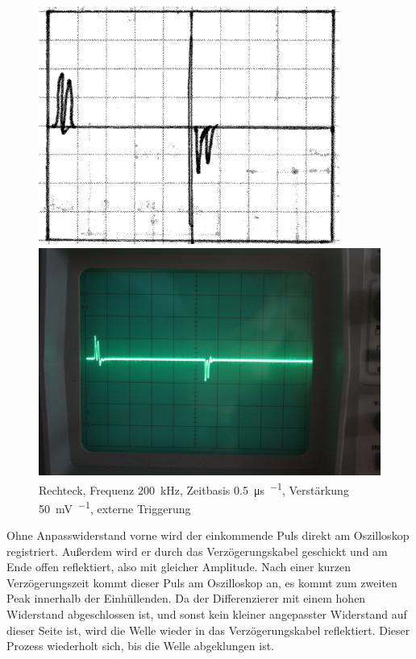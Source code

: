 \begin{figure}[htbp]
	\centering
	\begin{minipage}{.45\linewidth}
	\includegraphics[width=\linewidth]{Skizzen/IMG_0765-1500.jpg}
	\end{minipage}
	\hfill
	\begin{minipage}{.45\linewidth}
	\includegraphics[width=\linewidth]{Fotos/IMG_0765-1500.jpg}
	\end{minipage}
	\caption{%
		Rechteck, Frequenz \SI{200}{\kilo\hertz},
		Zeitbasis \SI{.5}{\micro\second\per\division},
		Verstärkung \SI{50}{\milli\volt\per\division},
		externe Triggerung
	}
	\label{fig:0765}
\end{figure}

Ohne Anpasswiderstand vorne wird der einkommende Puls direkt am Oszilloskop
registriert. Außerdem wird er durch das Verzögerungskabel geschickt und am Ende
offen reflektiert, also mit gleicher Amplitude. Nach einer kurzen
Verzögerungszeit kommt dieser Puls am Oszilloskop an, es kommt zum zweiten Peak
innerhalb der Einhüllenden. Da der Differenzierer mit einem hohen Widerstand
abgeschlossen ist, und sonst kein kleiner angepasster Widerstand auf dieser
Seite ist, wird die Welle wieder in das Verzögerungskabel reflektiert. Dieser
Prozess wiederholt sich, bis die Welle abgeklungen ist.

